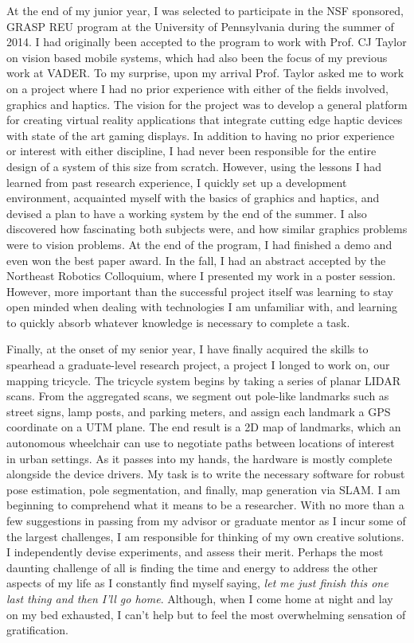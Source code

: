 \documentclass[10pt]{article}
\begin{document}
\clearpage

At the end of my junior year, I was selected to participate in the NSF
sponsored, GRASP REU program at the University of Pennsylvania during the
summer of 2014. I had originally been accepted to the program to work with
Prof. CJ Taylor on vision based mobile systems, which had also been the focus
of my previous work at VADER. To my surprise, upon my arrival Prof. Taylor
asked me to work on a project where I had no prior experience with either of
the fields involved, graphics and haptics. The vision for the project was to
develop a general platform for creating virtual reality applications that
integrate cutting edge haptic devices with state of the art gaming displays.
In addition to having no prior experience or interest with either discipline, I
had never been responsible for the entire design of a system of this size from
scratch.  However, using the lessons I had learned from past research
experience, I quickly set up a development environment, acquainted myself with
the basics of graphics and haptics, and devised a plan to have a working system
by the end of the summer. I also discovered how fascinating both subjects were,
and how similar graphics problems were to vision problems. At the end of the
program, I had finished a demo and even won the best paper award. In the fall,
I had an abstract accepted by the Northeast Robotics Colloquium, where I
presented my work in a poster session.  However, more important than the
successful project itself was learning to stay open minded when dealing with
technologies I am unfamiliar with, and learning to quickly absorb whatever
knowledge is necessary to complete a task.

Finally, at the onset of my senior year, I have finally acquired the skills to
spearhead a graduate-level research project, a project I longed to work on, our
mapping tricycle. The tricycle system begins by taking a series of planar LIDAR
scans. From the aggregated scans, we segment out pole-like landmarks such as
street signs, lamp posts, and parking meters, and assign each landmark a GPS
coordinate on a UTM plane.  The end result is a 2D map of landmarks, which an
autonomous wheelchair can use to negotiate paths between locations of interest
in urban settings. As it passes into my hands, the hardware is mostly complete
alongside the device drivers. My task is to write the necessary software for
robust pose estimation, pole segmentation, and finally, map generation via
SLAM. I am beginning to comprehend what it means to be a researcher. With no
more than a few suggestions in passing from my advisor or graduate mentor as I
incur some of the largest challenges, I am responsible for thinking of my own
creative solutions. I independently devise experiments, and assess their merit.
Perhaps the most daunting challenge of all is finding the time  and energy to
address the other aspects of my life as I constantly find myself saying,
\emph{let me just finish this one last thing and then I'll go home}. Although,
when I come home at night and lay on my bed exhausted, I can't help but to feel
the most overwhelming sensation of gratification.
\end{document}
